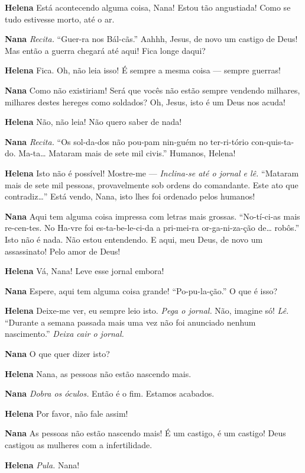 \textbf{Helena} Está acontecendo alguma coisa, Nana! Estou tão angustiada! Como se tudo
estivesse morto, até o ar.

\textbf{Nana} \emph{Recita.} ``Guer-ra nos Bál-cãs.'' Aahhh, Jesus, de novo um castigo
de Deus! Mas então a guerra chegará até aqui! Fica longe daqui?

\textbf{Helena} Fica. Oh, não leia isso! É sempre a mesma coisa --- sempre guerras!

\textbf{Nana} Como não existiriam! Será que vocês não estão sempre vendendo milhares,
milhares destes hereges como soldados? Oh, Jesus, isto é um Deus nos acuda!

\textbf{Helena} Não, não leia! Não quero saber de nada!

\textbf{Nana} \emph{Recita.} ``Os sol-da-dos não pou-pam nin-guém no ter-ri-tório
con-quis-ta-do. Ma-ta\ldots{} Mataram mais de sete mil civis.'' Humanos, Helena!

\textbf{Helena} Isto não é possível! Mostre-me --- \emph{Inclina-se até o jornal e lê.}
``Mataram mais de sete mil pessoas, provavelmente sob ordens do comandante. Este
ato que contradiz\ldots{}” Está vendo, Nana, isto lhes foi ordenado pelos humanos!

\textbf{Nana} Aqui tem alguma coisa impressa com letras mais grossas. ``No-tí-ci-as mais
re-cen-tes. No Ha-vre foi es-ta-be-le-ci-da a pri-mei-ra or-ga-ni-za-ção de\ldots{}
robôs.'' Isto não é nada. Não estou entendendo. E aqui, meu Deus, de novo um
assassinato! Pelo amor de Deus!

\textbf{Helena} Vá, Nana! Leve esse jornal embora!

\textbf{Nana} Espere, aqui tem alguma coisa grande! ``Po-pu-la-ção.'' O que é isso?

\textbf{Helena} Deixe-me ver, eu sempre leio isto. \emph{Pega o jornal.} Não, imagine
só! \emph{Lê.} “Durante a semana passada mais uma vez não foi anunciado nenhum
nascimento.'' \emph{Deixa cair o jornal.}

\textbf{Nana} O que quer dizer isto?

\textbf{Helena} Nana, as pessoas não estão nascendo mais.

\textbf{Nana} \emph{Dobra os óculos.} Então é o fim. Estamos acabados.

\textbf{Helena} Por favor, não fale assim!

\textbf{Nana} As pessoas não estão nascendo mais! É um castigo, é um castigo! Deus
castigou as mulheres com a infertilidade.

\textbf{Helena} \emph{Pula.} Nana!

